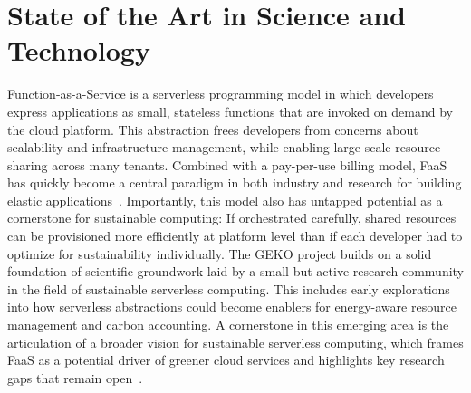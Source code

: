 \clearpage
\section{State of the Art in Science and Technology}
\label{sec:standWiss}


\newcommand{\absatz}[1]{\emph{#1.}}

Function-as-a-Service is a serverless programming model in which developers express applications as small, stateless functions that are invoked on demand by the cloud platform. 
This abstraction frees developers from concerns about scalability and infrastructure management, while enabling large-scale resource sharing across many tenants. 
Combined with a pay-per-use billing model, FaaS has quickly become a central paradigm in both industry and research for building elastic applications~\cite{jonas_cloud_2019}.
Importantly, this model also has untapped potential as a cornerstone for sustainable computing: If orchestrated carefully, shared resources can be provisioned more efficiently at platform level than if each developer had to optimize for sustainability individually.
The GEKO project builds on a solid foundation of scientific groundwork laid by a small but active research community in the field of sustainable serverless computing. 
This includes early explorations into how serverless abstractions could become enablers for energy-aware resource management and carbon accounting. 
A cornerstone in this emerging area is the articulation of a broader vision for sustainable serverless computing, which frames FaaS as a potential driver of greener cloud services and highlights key research gaps that remain open~\cite{sharma_challenges_2023}.

